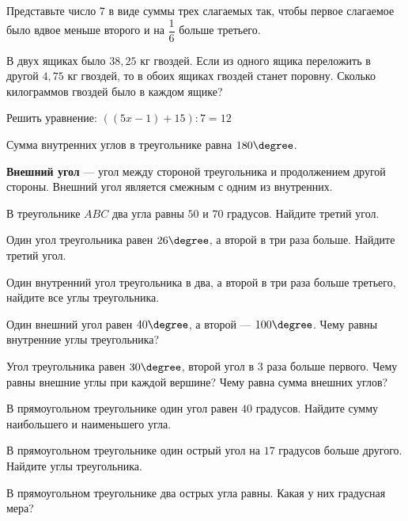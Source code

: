 \begin{class}[number=5]
	\begin{listofex}
		\item Представьте число \(7\) в виде суммы трех слагаемых так, чтобы первое слагаемое было вдвое меньше второго и на \(\dfrac{1}{6}\) больше третьего.
		\item В двух ящиках было \(38,25\) кг гвоздей. Если из одного ящика переложить в другой \(4,75\) кг гвоздей, то в обоих ящиках гвоздей станет поровну. Сколько килограммов гвоздей было в каждом ящике?
		\item Решить уравнение: \( ((5x-1)+15):7=12\)
	\end{listofex}
	\begin{definit}
		Сумма внутренних углов в треугольнике равна \( 180\degree \).
	\end{definit}
	\begin{definit}
		\textbf{Внешний угол} --- угол между стороной треугольника и продолжением другой стороны. Внешний угол является смежным с одним из внутренних.
	\end{definit}
	\begin{listofex}
		\item В треугольнике \( ABC \) два угла равны \( 50\) и \( 70 \) градусов. Найдите третий угол.
		\item Один угол треугольника равен \( 26\degree \), а второй в три раза больше. Найдите третий угол.
		\item Один внутренний угол треугольника в два, а второй в три раза больше третьего, найдите все углы треугольника.
		\item Один внешний угол равен \( 40\degree \), а второй --- \( 100\degree \). Чему равны внутренние углы треугольника?
		\item Угол треугольника равен \( 30\degree \), второй угол в \( 3 \) раза больше первого. Чему равны внешние углы при каждой вершине? Чему равна сумма внешних углов?
		\item В прямоугольном треугольнике один угол равен \( 40 \) градусов. Найдите сумму наибольшего и наименьшего угла.
		\item В прямоугольном треугольнике один острый угол на \( 17 \) градусов больше другого. Найдите углы треугольника.
		\item В прямоугольном треугольнике два острых угла равны. Какая у них градусная мера?
	\end{listofex}
\end{class}


